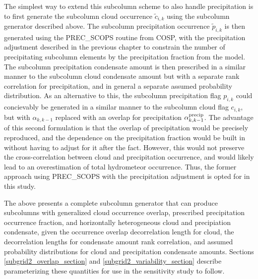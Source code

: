 The simplest way to extend this subcolumn scheme to also handle precipitation is to first generate the subcolumn cloud occurrence $\tilde{c}_{i, k}$ using the subcolumn generator described above. The subcolumn precipitation occurrence $\tilde{p}_{i, k}$ is then generated using the PREC\_SCOPS routine from COSP, with the precipitation adjustment described in the previous chapter to constrain the number of precipitating subcolumn elements by the precipitation fraction from the model. The subcolumn precipitation condensate amount is then prescribed in a similar manner to the subcolumn cloud condensate amount but with a separate rank correlation for precipitation, and in general a separate assumed probability distribution. As an alternative to this, the subcolumn precipitation flag $p_{i, k}$ could concievably be generated in a similar manner to the subcolumn cloud flag $c_{i, k}$, but with $\alpha_{k, k-1}$ replaced with an overlap for precipitation $\alpha^{\rm precip}_{k, k-1}$. The advantage of this second formulation is that the overlap of precipitation would be precisely reproduced, and the dependence on the precipitation fraction would be built in without having to adjust for it after the fact. However, this would not preserve the cross-correlation between cloud and precipitation occurrence, and would likely lead to an overestimation of total hydrometeor occurrence. Thus, the former approach using PREC\_SCOPS with the precipitation adjustment is opted for in this study.

The above presents a complete subcolumn generator that can produce subcolumns with generalized cloud occurrence overlap, prescribed precipitation occurrence fraction, and horizontally heterogeneous cloud and precipiation condensate, given the occurrence overlap decorrelation length for cloud, the decorrelation lengths for condensate amount rank correlation, and assumed probability distributions for cloud and precipitation condensate amounts. Sections \ref{subgrid2_overlap_section} and \ref{subgrid2_variability_section} describe parameterizing these quantities for use in the sensitivity study to follow.

